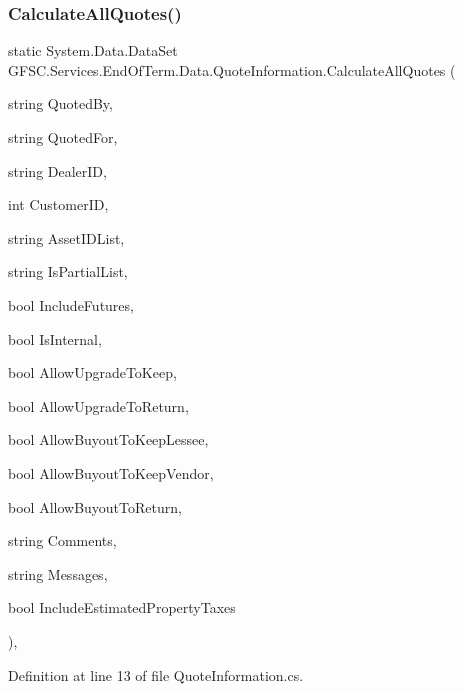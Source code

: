\subsubsection{\texorpdfstring{Calculate\+All\+Quotes()}{CalculateAllQuotes()}}
{\footnotesize\ttfamily static System.\+Data.\+Data\+Set G\+F\+S\+C.\+Services.\+End\+Of\+Term.\+Data.\+Quote\+Information.\+Calculate\+All\+Quotes (\begin{DoxyParamCaption}\item[{string}]{Quoted\+By,  }\item[{string}]{Quoted\+For,  }\item[{string}]{Dealer\+ID,  }\item[{int}]{Customer\+ID,  }\item[{string}]{Asset\+I\+D\+List,  }\item[{string}]{Is\+Partial\+List,  }\item[{bool}]{Include\+Futures,  }\item[{bool}]{Is\+Internal,  }\item[{bool}]{Allow\+Upgrade\+To\+Keep,  }\item[{bool}]{Allow\+Upgrade\+To\+Return,  }\item[{bool}]{Allow\+Buyout\+To\+Keep\+Lessee,  }\item[{bool}]{Allow\+Buyout\+To\+Keep\+Vendor,  }\item[{bool}]{Allow\+Buyout\+To\+Return,  }\item[{string}]{Comments,  }\item[{string}]{Messages,  }\item[{bool}]{Include\+Estimated\+Property\+Taxes }\end{DoxyParamCaption})\hspace{0.3cm}{\ttfamily [static]}, {\ttfamily [package]}}



Definition at line 13 of file Quote\+Information.\+cs.

\mbox{\label{class_g_f_s_c_1_1_services_1_1_end_of_term_1_1_data_1_1_quote_information_add6fc3465c4dd7ebe30f079bcf710377}} 

